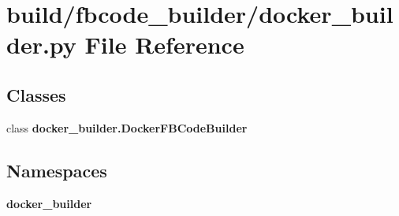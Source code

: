 \section{build/fbcode\+\_\+builder/docker\+\_\+builder.py File Reference}
\label{docker__builder_8py}
\subsection*{Classes}
\begin{DoxyCompactItemize}
\item 
class {\bf docker\+\_\+builder.\+Docker\+F\+B\+Code\+Builder}
\end{DoxyCompactItemize}
\subsection*{Namespaces}
\begin{DoxyCompactItemize}
\item 
 {\bf docker\+\_\+builder}
\end{DoxyCompactItemize}
